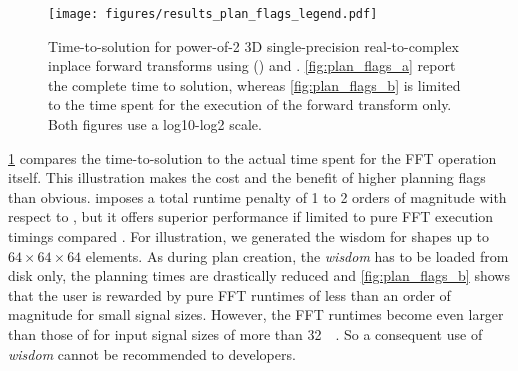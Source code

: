\begin{figure}[!htbp]
  \centering
  \texttt{[image: figures/results\_plan\_flags\_legend.pdf]}\vspace{-1em}
  \hfill
  \caption{Time-to-solution for power-of-2 3D single-precision real-to-complex inplace forward transforms using \fftw{} () and \cufft{}. \cref{fig:plan_flags_a} report the complete time to solution, whereas \cref{fig:plan_flags_b} is limited to the time spent for the execution of the forward transform only. Both figures use a log10-log2 scale.}
  \label{fig:fftw_plan_flags}
\end{figure}

\cref{fig:fftw_plan_flags} compares the time-to-solution to the actual time spent for the FFT operation itself. This illustration makes the cost and the benefit of higher planning flags than  obvious.  imposes a total runtime penalty of 1 to 2 orders of magnitude with respect to , but it offers superior performance if limited to pure FFT execution timings compared . For illustration, we generated the wisdom for shapes up to $64\times64\times64$ elements. As during plan creation, the \emph{wisdom} has to be loaded from disk only, the planning times are drastically reduced and \cref{fig:plan_flags_b} shows that the user is rewarded by pure FFT runtimes of less than an order of magnitude for small signal sizes. However, the FFT runtimes become even larger than those of  for input signal sizes of more than \SI{32}{\kibi\byte}. So a consequent use of \fftw{} \emph{wisdom} cannot be recommended to developers. 

